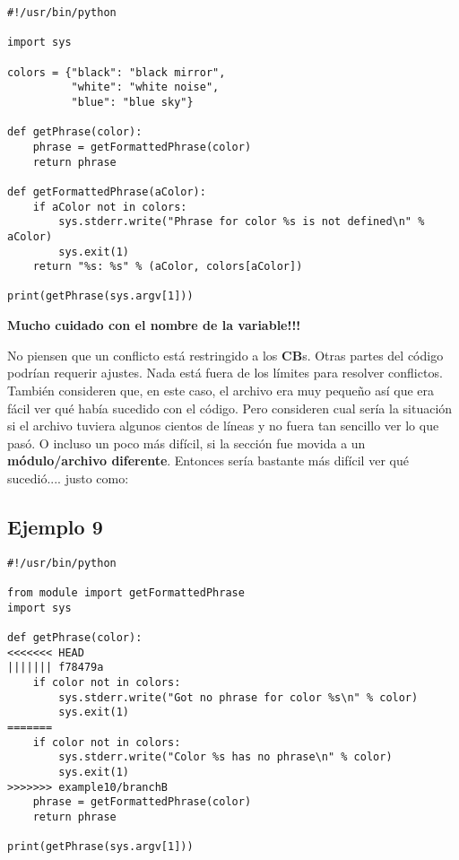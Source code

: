 \begin{lstlisting}[style=python_style,
	basicstyle=\small,
	caption={\bf Ejemplo 8} - resolución]
#!/usr/bin/python

import sys

colors = {"black": "black mirror",
          "white": "white noise",
          "blue": "blue sky"}

def getPhrase(color):
    phrase = getFormattedPhrase(color)
    return phrase

def getFormattedPhrase(aColor):
    if aColor not in colors:
        sys.stderr.write("Phrase for color %s is not defined\n" % aColor)
        sys.exit(1)
    return "%s: %s" % (aColor, colors[aColor])

print(getPhrase(sys.argv[1]))
\end{lstlisting}
{\bf Mucho cuidado con el nombre de la variable!!!}

No piensen que un conflicto está restringido a los {\bf CB}s. Otras partes del código podrían requerir ajustes.
Nada está fuera de los límites para resolver conflictos. También consideren que, en este caso, el archivo era muy pequeño
así que era fácil ver qué había sucedido con el código. Pero consideren cual sería la situación si el archivo tuviera algunos
cientos de líneas y no fuera tan sencillo ver lo que pasó. O incluso un poco más difícil, si la sección fue movida a un
{\bf módulo/archivo diferente}. Entonces sería bastante más difícil ver qué sucedió.... justo como:

\subsection{Ejemplo 9}
\label{example_09}

\begin{lstlisting}[style=python_style,
	basicstyle=\small,
	caption={\bf Ejemplo 9}]
#!/usr/bin/python

from module import getFormattedPhrase
import sys

def getPhrase(color):
<<<<<<< HEAD
||||||| f78479a
    if color not in colors:
        sys.stderr.write("Got no phrase for color %s\n" % color)
        sys.exit(1)
=======
    if color not in colors:
        sys.stderr.write("Color %s has no phrase\n" % color)
        sys.exit(1)
>>>>>>> example10/branchB
    phrase = getFormattedPhrase(color)
    return phrase

print(getPhrase(sys.argv[1]))
\end{lstlisting}

